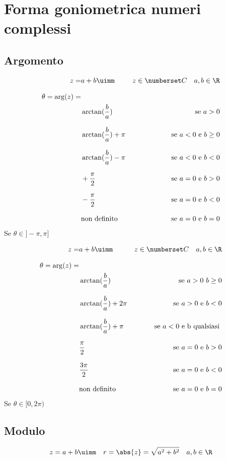 \chapter{Forma goniometrica numeri complessi}
\section{Argomento}
\begin{align*}
z=&a+b\uimm& z\in\Co\quad a,b\in\R\\[8pt]
\theta=\arg(z)=&\\
&\arctan(\dfrac{b}{a})&\text{se}\ a>0 \\[8pt]
&\arctan(\dfrac{b}{a})+\pi&\text{se}\ a<0 \ \text{e} \ b\geq0\\[8pt]
&\arctan(\dfrac{b}{a})-\pi&\text{se}\ a<0\ \text{e} \ b<0\\[8pt]
&+\dfrac{\pi}{2}&\text{se}\ a=0 \ \text{e} \ b>0\\[8pt]
&-\dfrac{\pi}{2}&\text{se}\ a=0 \ \text{e} \ b<0\\[8pt]
&\text{non definito}&\text{se}\ a=0 \ \text{e} \ b=0
\end{align*}
Se $\theta\in]-\pi,\pi]$

\begin{align*}
z=&a+b\uimm& z\in\Co\quad a,b\in\R\\[8pt]
\theta=\arg(z)=&\\
&\arctan(\dfrac{b}{a})&\text{se}\ a>0\ b\geq 0 \\[8pt]
&\arctan(\dfrac{b}{a})+2\pi&\text{se}\ a>0 \ \text{e} \ b<0\\[8pt]
&\arctan(\dfrac{b}{a})+\pi&\text{se}\ a<0\ \text{e b qualsiasi} \ \\[8pt]
&\dfrac{\pi}{2}&\text{se}\ a=0 \ \text{e} \ b>0\\[8pt]
&\dfrac{3\pi}{2}&\text{se}\ a=0 \ \text{e} \ b<0\\[8pt]
&\text{non definito}&\text{se}\ a=0 \ \text{e} \ b=0
\end{align*}
Se $\theta\in[0,2\pi)$
 \section{Modulo}
\begin{equation*}
z=a+b\uimm\quad r=\abs{z}=\sqrt{a^2+b^2}\quad a,b\in\R
\end{equation*}
